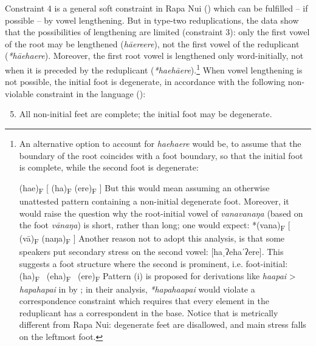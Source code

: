 Constraint 4 is a general soft constraint in Rapa Nui () which can be fulfilled – if possible – by vowel lengthening. But in type-two reduplications, the data show that the possibilities of lengthening are limited (constraint 3): only the first vowel of the root may be lengthened (\textit{h}\textit{ā{\ꞌ}ere{\ꞌ}ere}), not the first vowel of the reduplicant (\textit{*hā{\ꞌ}eha{\ꞌ}ere}). Moreover, the first root vowel is lengthened only word-initially, not when it is preceded by the reduplicant (\textit{*ha{\ꞌ}ehā{\ꞌ}ere}).\footnote{\label{fn:78}An alternative option to account for \textit{ha{\ꞌ}eha{\ꞌ}ere} would be, to assume that the boundary of the root coincides with a foot boundary, so that the initial foot is complete, while the second foot is degenerate: 

\ea
  \textup{(ha{\ꞌ}e)\textsubscript{F}   [ (ha)\textsubscript{F}   ({\ꞌ}ere)\textsubscript{F} ]}
\z
But this would mean assuming an otherwise unattested pattern containing a non-initial degenerate foot. Moreover, it would raise the question why the root-initial vowel of \textit{vanavanaŋa} (based on the foot \textit{vānaŋa}) is short, rather than long; one would expect:
\ea
  \textup{*(vana)\textsubscript{F}   [ (vā)\textsubscript{F}   (naŋa)\textsubscript{F} ]}
\z
Another reason not to adopt this analysis, is that some speakers put secondary stress on the second vowel: [haˌʔehaˈʔere]. This suggests a foot structure where the second  is prominent, i.e. foot-initial:
\ea
\textup{(ha)\textsubscript{F}~  ({\ꞌ}eha)\textsubscript{F}~  ({\ꞌ}ere)\textsubscript{F}}
\z
Pattern (i) is proposed for derivations like \textit{haapai} > \textit{hapahapai} in  by \citet[161]{MeyerhoffReynolds1996}; in their analysis, \textit{*hapahaapai} would violate a correspondence constraint which requires that every element in the reduplicant has a correspondent in the base. Notice that  is metrically different from Rapa Nui: degenerate feet are disallowed, and main stress falls on the leftmost foot.}\textstyleFootnoteSymbol{} When vowel lengthening is not possible, the initial foot is degenerate, in accordance with the following non-violable constraint in the language ():

\begin{enumerate}
\setcounter{enumi}{4}

\item \glt
All non-initial feet are complete; the initial foot may be degenerate.

\end{enumerate}

